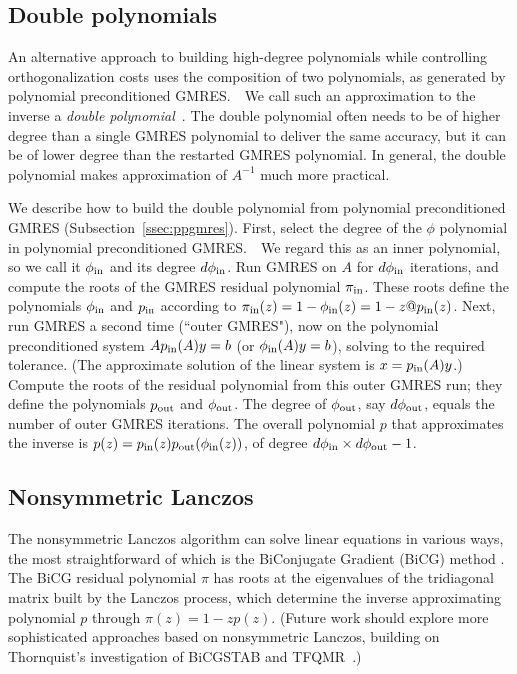 \documentclass{siamart}
\def\dphiin{d\phi_{\rm in}}
\begin{document}
\subsection{Double polynomials}
An alternative approach to building high-degree polynomials while controlling orthogonalization costs uses the composition of two polynomials, as generated by polynomial preconditioned GMRES.\ \ 
We call such an approximation to the inverse a \emph{double polynomial}~\cite{PPArn,PPGStable}. The double polynomial often needs to be of higher degree than a single GMRES polynomial to deliver the same accuracy, but it can be of lower degree than the restarted GMRES polynomial.  In general, the double polynomial makes approximation of $A^{-1}$  much more practical.  

We describe how to build the double polynomial from polynomial preconditioned GMRES (Subsection~\ref{ssec:ppgmres}).  First, select the degree of the $\phi$ polynomial in polynomial preconditioned GMRES.\ \  We regard this as an inner polynomial, so we call it $\phi_{\rm in}$ and its degree $\dphiin$.  Run GMRES on $A$ for $\dphiin$ iterations, and compute the roots of the GMRES residual polynomial $\pi_{\rm in}$.  These roots define the polynomials $\phi_{\rm in}$ and $p_{\rm in}$ according to $\pi_{\rm in}(z) = 1 - \phi_{\rm in}(z) = 1 - z@p_{\rm in}(z)$.  Next, run GMRES a second time (``outer GMRES"), now on the polynomial preconditioned system $Ap_{\rm in}(A)y = b$ (or $\phi_{\rm in}(A)y = b$), solving to the required tolerance.  (The approximate solution of the linear system is $x = p_{\rm in}(A) y$.)   Compute the roots of the residual polynomial from this outer GMRES run; they define the polynomials $p_{\rm out}$ and $\phi_{\rm out}$.  The degree of $\phi_{\rm out}$, say $d\phi_{\rm out}$, equals the number of outer GMRES iterations.  The overall polynomial $p$ that approximates the inverse is $p(z) = p_{\rm in}(z) p_{\rm out}(\phi_{\rm in}(z))$, of degree $d\phi_{\rm in} \times d\phi_{\rm out} - 1$.

\subsection{Nonsymmetric Lanczos}
The nonsymmetric Lanczos algorithm can solve linear equations in various ways, the most straightforward of which is the BiConjugate Gradient (BiCG) method \cite{Sa03}.  The BiCG residual polynomial $\pi$ has roots at the eigenvalues of the tridiagonal matrix built by the Lanczos process, which determine the inverse approximating polynomial $p$ through $\pi(z) = 1 - zp(z)$.  (Future work should explore more sophisticated approaches based on nonsymmetric Lanczos, building on Thornquist's investigation of BiCGSTAB and TFQMR~\cite{Tho06}.)
\end{document}
